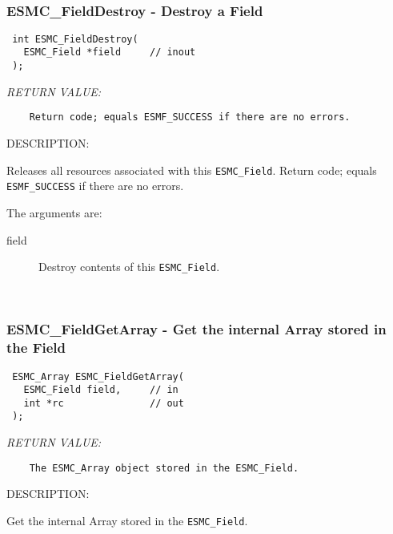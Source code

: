  
\mbox{}\hrulefill\ 
 
\subsubsection [ESMC\_FieldDestroy] {ESMC\_FieldDestroy - Destroy a Field}


  
\begin{verbatim} int ESMC_FieldDestroy(
   ESMC_Field *field     // inout
 );
 \end{verbatim}{\em RETURN VALUE:}
\begin{verbatim}    Return code; equals ESMF_SUCCESS if there are no errors.\end{verbatim}
{\sf DESCRIPTION:\\ }


  
    Releases all resources associated with this {\tt ESMC\_Field}.
      Return code; equals {\tt ESMF\_SUCCESS} if there are no errors.
  
    The arguments are:
    \begin{description}
    \item[field]
      Destroy contents of this {\tt ESMC\_Field}.
    \end{description}
   
 
\mbox{}\hrulefill\ 
 
\subsubsection [ESMC\_FieldGetArray] {ESMC\_FieldGetArray - Get the internal Array stored in the Field}


  
\begin{verbatim} ESMC_Array ESMC_FieldGetArray(
   ESMC_Field field,     // in
   int *rc               // out
 );
 \end{verbatim}{\em RETURN VALUE:}
\begin{verbatim}    The ESMC_Array object stored in the ESMC_Field.\end{verbatim}
{\sf DESCRIPTION:\\ }


  
    Get the internal Array stored in the {\tt ESMC\_Field}.
  
